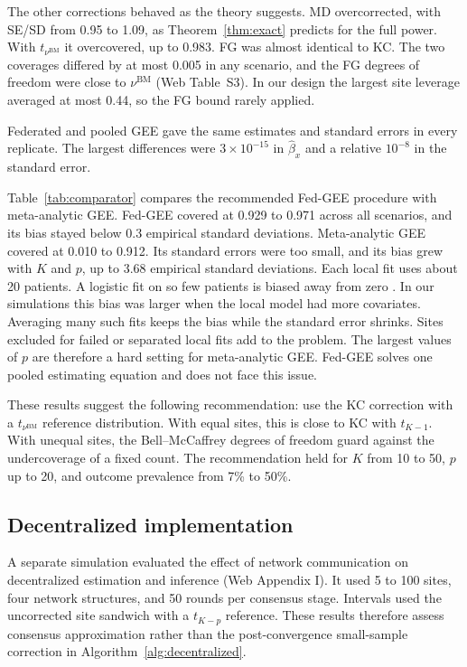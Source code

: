 \documentclass[12pt]{article}
\theoremstyle{remark}
\begin{document}
The other corrections behaved as the theory suggests. MD overcorrected, with
SE/SD from 0.95 to 1.09, as Theorem~\ref{thm:exact} predicts for the full power.
With $t_{\nu^{\mathrm{BM}}}$ it overcovered, up to 0.983. FG was almost identical
to KC. The two coverages differed by at most 0.005 in any scenario, and the FG
degrees of freedom were close to $\nu^{\mathrm{BM}}$ (Web Table~S3). In our
design the largest site leverage averaged at most 0.44, so the FG bound rarely
applied.

Federated and pooled GEE gave the same estimates and standard errors in every
replicate. The largest differences were $3\times10^{-15}$ in $\widehat\beta_x$ and
a relative $10^{-8}$ in the standard error.

Table~\ref{tab:comparator} compares the recommended Fed-GEE procedure with
meta-analytic GEE. Fed-GEE covered at 0.929 to 0.971 across all scenarios, and its
bias stayed below 0.3 empirical standard deviations. Meta-analytic GEE covered at
0.010 to 0.912. Its standard errors were too small, and its bias grew with $K$ and
$p$, up to 3.68 empirical standard deviations. Each local fit uses
about 20 patients. A logistic fit on so few patients is biased away from zero
\citep{firth1993bias}. In our simulations this bias was larger when
the local model had more covariates. Averaging many such fits keeps the bias while the standard error shrinks. Sites
excluded for failed or separated local fits add to the problem. The largest
values of $p$ are therefore a hard setting for meta-analytic GEE. Fed-GEE solves
one pooled estimating equation and does not face this issue.

These results suggest the following recommendation: use the KC correction with a
$t_{\nu^{\mathrm{BM}}}$ reference distribution. With equal sites, this is close
to KC with $t_{K-1}$. With unequal sites, the Bell--McCaffrey degrees of freedom
guard against the undercoverage of a fixed count. The recommendation held for
$K$ from 10 to 50, $p$ up to 20, and outcome prevalence from 7\% to 50\%.

\subsection{Decentralized implementation}
\label{sec:decsim}

A separate simulation evaluated the effect of network communication on
decentralized estimation and inference (Web Appendix I). It used 5 to 100
sites, four network structures, and 50 rounds per consensus stage. Intervals
used the uncorrected site sandwich with a $t_{K-p}$ reference. These results
therefore assess consensus approximation rather than the post-convergence
small-sample correction in Algorithm~\ref{alg:decentralized}.
\end{document}
